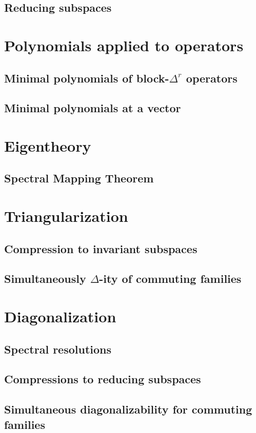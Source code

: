 \documentclass{article}
\theoremstyle{definition}
\begin{document}
\subsection{Reducing subspaces}
\newpage 
\section{Polynomials applied to operators}
\subsection{Minimal polynomials of block-$\Delta^r$ operators}
\subsection{Minimal polynomials at a vector}
\newpage 
\section{Eigentheory}
\subsection{Spectral Mapping Theorem}
\newpage 
\section{Triangularization}
\subsection{Compression to invariant subspaces}
\subsection{Simultaneously $\Delta$-ity of commuting families}
\newpage 
\section{Diagonalization}
\subsection{Spectral resolutions}
\subsection{Compressions to reducing subspaces}
\subsection{Simultaneous diagonalizability for commuting families}
\newpage
\end{document}
